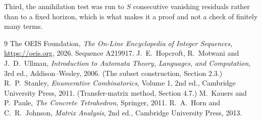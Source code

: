\documentclass[11pt,a4paper]{article}
\theoremstyle{plain}
\theoremstyle{definition}
\begin{document}
Third, the annihilation test was run to $S$ consecutive vanishing residuals rather than to a
fixed horizon, which is what makes it a proof and not a check of finitely many terms.

\begin{thebibliography}{9}
 The OEIS Foundation, \emph{The On-Line Encyclopedia of Integer
Sequences}, \url{https://oeis.org}, 2026. Sequence A219917.
 J.~E.~Hopcroft, R.~Motwani and J.~D.~Ullman, \emph{Introduction to Automata
Theory, Languages, and Computation}, 3rd ed., Addison--Wesley, 2006. (The subset
construction, Section 2.3.)
 R.~P.~Stanley, \emph{Enumerative Combinatorics}, Volume 1, 2nd ed.,
Cambridge University Press, 2011. (Transfer-matrix method, Section 4.7.)
 M.~Kauers and P.~Paule, \emph{The Concrete Tetrahedron}, Springer, 2011.
 R.~A.~Horn and C.~R.~Johnson, \emph{Matrix Analysis}, 2nd ed., Cambridge
University Press, 2013.
\end{thebibliography}
\end{document}
